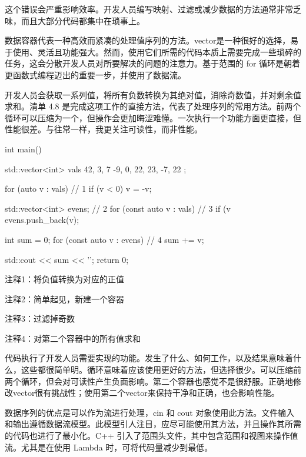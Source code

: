 这个错误会严重影响效率。开发人员编写映射、过滤或减少数据的方法通常非常乏味，而且大部分代码都集中在琐事上。


数据容器代表一种高效而紧凑的处理值序列的方法。vector是一种很好的选择，易于使用、灵活且功能强大。然而，使用它们所需的代码本质上需要完成一些琐碎的任务，这会分散开发人员对所要解决的问题的注意力。基于范围的 for 循环是朝着更函数式编程迈出的重要一步，并使用了数据流。

开发人员会获取一系列值，将所有负数转换为其绝对值，消除奇数值，并对剩余值求和。清单 4.8 是完成这项工作的直接方法，代表了处理序列的常用方法。前两个循环可以压缩为一个，但操作会更加晦涩难懂。一次执行一个功能方面更直接，但性能很差。与往常一样，我更关注可读性，而非性能。


\begin{cpp}
int main() {
  std::vector<int> vals { 42, 3, 7 -9, 0, 22, 23, -7, 22 };

  for (auto v : vals) // 1
    if (v < 0)
      v = -v;

  std::vector<int> evens; // 2
  for (const auto v : vals) // 3
    if (v %
      evens.push_back(v);

  int sum = 0;
  for (const auto v : evens) // 4
    sum += v;

  std::cout << sum << '\n';
  return 0;
}
\end{cpp}

{\footnotesize
注释1：将负值转换为对应的正值

注释2：简单起见，新建一个容器

注释3：过滤掉奇数

注释4：对第二个容器中的所有值求和
}


代码执行了开发人员需要实现的功能。发生了什么、如何工作，以及结果意味着什么，这些都很简单明。循环意味着应该使用更好的方法，但选择很少。可以压缩前两个循环，但会对可读性产生负面影响。第二个容器也感觉不是很舒服。正确地修改vector很有挑战性；使用第二个vector来保持干净和正确，也会影响性能。


数据序列的优点是可以作为流进行处理，cin 和 cout 对象使用此方法。文件输入和输出遵循数据流模型。此模型引人注目，应尽可能使用其方法，并且操作其所需的代码也进行了最小化。C++ 引入了范围头文件，其中包含范围和视图来操作值流。尤其是在使用 Lambda 时，可将代码量减少到最低。

